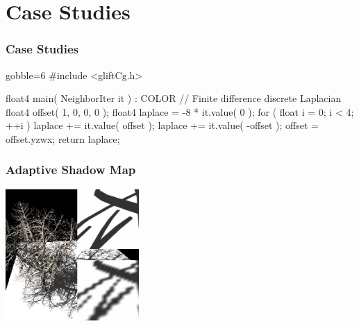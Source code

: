 \documentclass[xcolor={usenames,dvipsnames}]{beamer}
\begin{document}
\section{Case Studies}
\begin{frame}[fragile]
  \frametitle{Case Studies}

  \begin{overprint}
    \vspace{-5mm}
    \begin{ccode*}{gobble=6}
      #include <gliftCg.h>

      float4 main( NeighborIter it ) : COLOR
      {
        // Finite difference discrete Laplacian
        float4 offset( 1, 0, 0, 0 );
        float4 laplace = -8 * it.value( 0 );
        for ( float i = 0; i < 4; ++i ) {
          laplace += it.value( offset );
          laplace += it.value( -offset );
          offset = offset.yzwx;
        }
        return laplace;
      }
    \end{ccode*}
  \end{overprint}
\end{frame}

\begin{frame}[t]
  \frametitle{Adaptive Shadow Map}
  \begin{center}
    \includegraphics[height=5cm]{img/asm}
  \end{center}
\end{frame}
\end{document}

